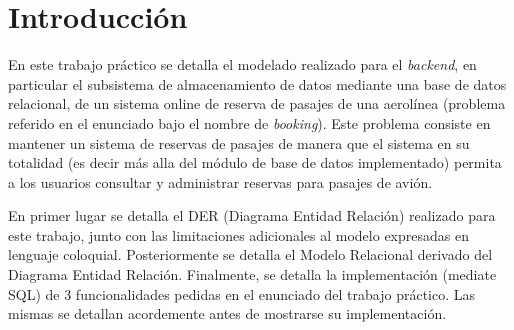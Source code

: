 \section{Introducci\'on}

En este trabajo pr\'actico se detalla el modelado realizado para
el \textit{backend}, en particular el subsistema de almacenamiento 
de datos mediante una base de datos relacional, de un sistema online
de reserva de pasajes de una aerol\'inea (problema referido en el enunciado 
bajo el nombre de \textit{booking}). Este problema consiste en mantener 
un sistema de reservas de pasajes de manera que el sistema en su totalidad 
(es decir m\'as alla del m\'odulo de base de datos implementado) permita a los
usuarios consultar y administrar reservas para pasajes de avi\'on.

En primer lugar se detalla el DER (Diagrama Entidad Relaci\'on) realizado
para este trabajo, junto con las limitaciones adicionales al modelo expresadas
en lenguaje coloquial. Posteriormente se detalla el Modelo Relacional derivado
del Diagrama Entidad Relaci\'on. Finalmente, se detalla la implementaci\'on
(mediate SQL) de 3 funcionalidades pedidas en el enunciado del trabajo pr\'actico.
Las mismas se detallan acordemente antes de mostrarse su implementaci\'on.
